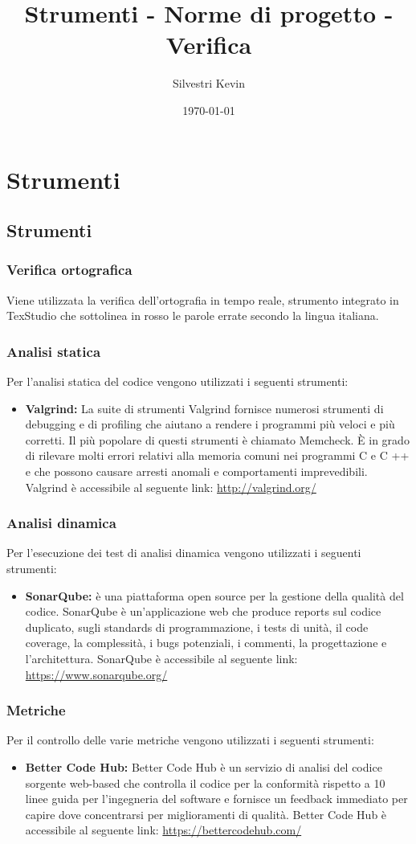 \documentclass[openany,12pt,a4paper]{report}
\title{Strumenti - Norme di progetto - Verifica}
\author{Silvestri Kevin}
\date{\today}
\begin{document}
\chapter{Strumenti}

\section{Strumenti}
\subsection{Verifica ortografica}
Viene utilizzata la verifica dell’ortografia in tempo reale, strumento integrato in TexStudio
che sottolinea in rosso le parole errate secondo la lingua italiana.
\subsection{Analisi statica}
Per l’analisi statica del codice vengono utilizzati i seguenti strumenti:
\begin{itemize}
\item \textbf{Valgrind:} La suite di strumenti Valgrind fornisce numerosi strumenti di debugging e di profiling che aiutano a rendere i programmi più veloci e più corretti. Il più popolare di questi strumenti è chiamato Memcheck. È in grado di rilevare molti errori relativi alla memoria comuni nei programmi C e C ++ e che possono causare arresti anomali e comportamenti imprevedibili. Valgrind è accessibile al seguente link: \url{http://valgrind.org/}
\end{itemize}
\subsection{Analisi dinamica}
Per l’esecuzione dei test di analisi dinamica vengono utilizzati i seguenti strumenti:
\begin{itemize}
\item \textbf{SonarQube:} è una piattaforma open source per la gestione della qualità del codice. SonarQube è un’applicazione web che produce reports sul codice duplicato, sugli standards di programmazione, i tests di unità, il code coverage, la complessità, i bugs potenziali, i commenti, la progettazione e l’architettura. SonarQube è accessibile al seguente link: \url{https://www.sonarqube.org/}
\end{itemize}
\subsection{Metriche}
Per il controllo delle varie metriche vengono utilizzati i seguenti strumenti:
\begin{itemize}
\item \textbf{Better Code Hub:} Better Code Hub è un servizio di analisi del codice sorgente web-based che controlla il codice per la conformità rispetto a 10 linee guida per l'ingegneria del software e fornisce un feedback immediato per capire dove concentrarsi per miglioramenti di qualità. Better Code Hub è accessibile al seguente link: \url{https://bettercodehub.com/}
\end{itemize}
\end{document}
